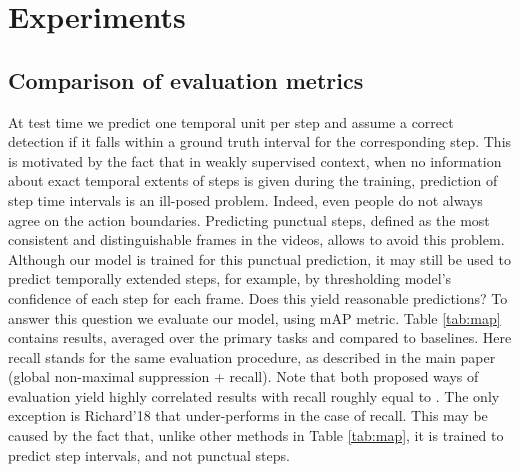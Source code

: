 \documentclass[10pt,twocolumn,letterpaper]{article}
\begin{document}
\section{Experiments}
\label{sec:experiments}


\subsection{Comparison of evaluation metrics}
\label{subsec:metrics}
At test time we predict one temporal unit per step and assume a correct detection if it falls within a ground truth interval for the corresponding step. This is motivated by the fact that in weakly supervised context, when no information about exact temporal extents of steps is given during the training, prediction of step time intervals is an ill-posed problem. Indeed, even people do not always agree on the action boundaries. Predicting punctual steps, defined as the most consistent and distinguishable frames in the videos, allows to avoid this problem.
Although our model is trained for this punctual prediction, it may still be used to predict temporally extended steps, for example, by thresholding model's confidence of each step for each frame. Does this yield reasonable predictions? To answer this question we evaluate our model, using mAP metric. Table \ref{tab:map} contains results, averaged over the primary tasks and compared to baselines. Here recall stands for the same evaluation procedure, as described in the main paper (global non-maximal suppression + recall).
Note that both proposed ways of evaluation yield highly correlated results with recall roughly equal to . The only exception is Richard'18 that under-performs in the case of recall. This may be caused by the fact that, unlike other methods in Table \ref{tab:map}, it is trained to predict step intervals, and not punctual steps.

\begin{table}[t]
\caption{Results of cross-task learning, evaluated with mAP and recall metrics and averaged over primary tasks. Standard deviation does not exceed 0.3\% for mAP and 1\% for recall.}
\label{tab:map}
\end{table}
\end{document}
